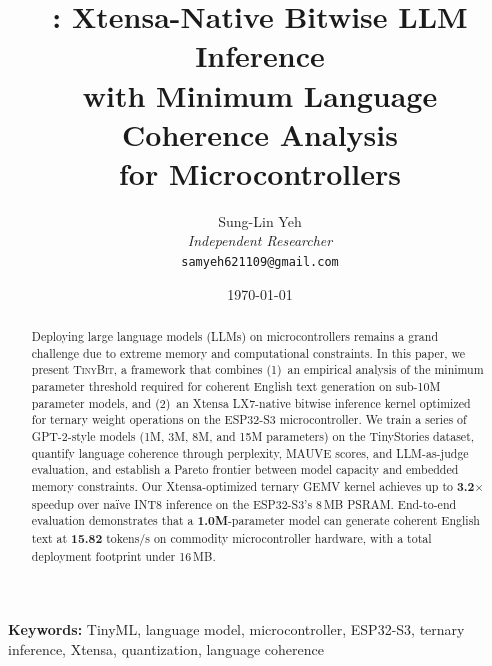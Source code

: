 \documentclass[10pt,twocolumn]{article}
\title{%
  \tinybit{}: Xtensa-Native Bitwise LLM Inference\\
  with Minimum Language Coherence Analysis\\
  for Microcontrollers%
}
\author{
  Sung-Lin Yeh \\
  \textit{Independent Researcher} \\
  \texttt{samyeh621109@gmail.com}
}
\date{\today}
\newcommand{\tinybit}{\textsc{TinyBit}}
\newcommand{\espss}{ESP32-S3}
\newcommand{\psram}{PSRAM}
\newcommand{\gemv}{\textsc{GEMV}}
\begin{document}
\maketitle

\begin{abstract}
Deploying large language models (LLMs) on microcontrollers remains a grand
challenge due to extreme memory and computational constraints. In this paper,
we present \tinybit{}, a framework that combines (1)~an empirical analysis of
the minimum parameter threshold required for coherent English text generation
on sub-10M parameter models, and (2)~an Xtensa LX7-native bitwise inference
kernel optimized for ternary weight operations on the \espss{} microcontroller.
We train a series of GPT-2-style models (1M, 3M, 8M, and 15M parameters) on
the TinyStories dataset, quantify language coherence through perplexity, MAUVE
scores, and LLM-as-judge evaluation, and establish a Pareto frontier between model capacity and embedded memory
constraints. Our Xtensa-optimized ternary \gemv{} kernel achieves up to
\textbf{3.2$\times$} speedup over na\"ive INT8 inference on the \espss{}'s
8\,MB \psram{}. End-to-end evaluation demonstrates that a \textbf{1.0M}-parameter
model can generate coherent English text at \textbf{15.82} tokens/s on commodity
microcontroller hardware, with a total deployment footprint under 16\,MB.
\end{abstract}

\noindent\textbf{Keywords:} TinyML, language model, microcontroller, ESP32-S3,
ternary inference, Xtensa, quantization, language coherence












\end{document}
